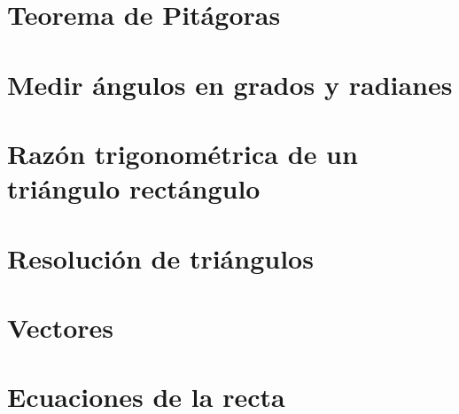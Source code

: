 
\section{Teorema de Pitágoras}



\section{Medir ángulos en grados y radianes}



\section{Razón trigonométrica de un triángulo rectángulo}



\section{Resolución de triángulos}



\section{Vectores}



\section{Ecuaciones de la recta}